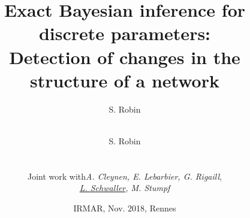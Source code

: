 \documentclass[9pt]{beamer}
\begin{document}

\title[Detecting change-points in network structure]{Exact Bayesian inference for discrete parameters: \\ Detection of changes in the structure of a network}

\author[S. Robin]{S. Robin \\ ~\\
  }

\author[S. Robin]{S. Robin \\ ~ \\
  \begin{tabular}{rl}
    Joint work with & {\sl A. Cleynen, E. Lebarbier, G. Rigaill}, \\
    & {\sl \underline{L. Schwaller}, M. Stumpf}
  \end{tabular}
  }


\date[Nov. 2018, Rennes]{IRMAR, Nov. 2018, Rennes}

\maketitle


\end{document}
